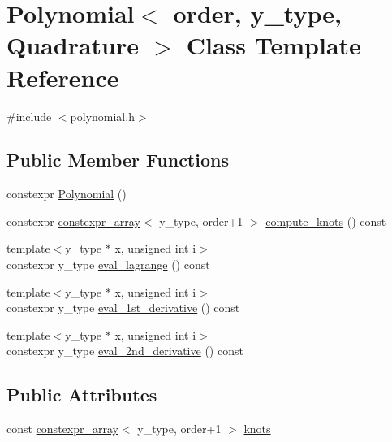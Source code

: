\hypertarget{class_polynomial}{}\section{Polynomial$<$ order, y\+\_\+type, Quadrature $>$ Class Template Reference}
\label{class_polynomial}


{\ttfamily \#include $<$polynomial.\+h$>$}

\subsection*{Public Member Functions}
\begin{DoxyCompactItemize}
\item 
constexpr \hyperlink{class_polynomial_a00671b3dba3b832c130d1f019c7702c3}{Polynomial} ()
\item 
constexpr \hyperlink{classconstexpr__array}{constexpr\+\_\+array}$<$ y\+\_\+type, order+1 $>$ \hyperlink{class_polynomial_a231fb6b5f655784af1628e9b2f261f08}{compute\+\_\+knots} () const
\item 
{\footnotesize template$<$y\+\_\+type $\ast$ x, unsigned int i$>$ }\\constexpr y\+\_\+type \hyperlink{class_polynomial_a045b1955cf3f6dda4db8b1b50048ab5b}{eval\+\_\+lagrange} () const
\item 
{\footnotesize template$<$y\+\_\+type $\ast$ x, unsigned int i$>$ }\\constexpr y\+\_\+type \hyperlink{class_polynomial_abd8ecf134802a11d3bd286a778b5772c}{eval\+\_\+1st\+\_\+derivative} () const
\item 
{\footnotesize template$<$y\+\_\+type $\ast$ x, unsigned int i$>$ }\\constexpr y\+\_\+type \hyperlink{class_polynomial_a8f135c739984908c26dd9c6dbe045614}{eval\+\_\+2nd\+\_\+derivative} () const
\end{DoxyCompactItemize}
\subsection*{Public Attributes}
\begin{DoxyCompactItemize}
\item 
const \hyperlink{classconstexpr__array}{constexpr\+\_\+array}$<$ y\+\_\+type, order+1 $>$ \hyperlink{class_polynomial_a4319b08af5d88c22598210920ef74d7d}{knots}
\end{DoxyCompactItemize}


